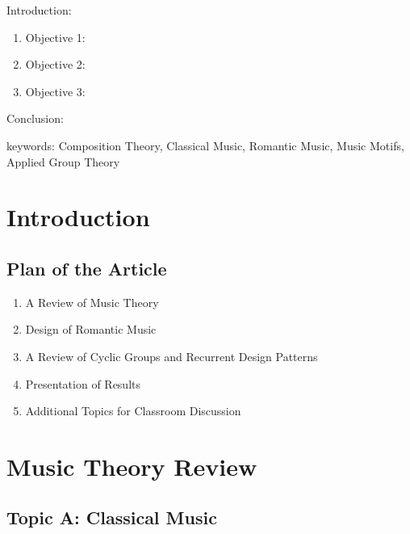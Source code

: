 
\twocolumn
\scriptsize
\begin{frontmatter}
		\title{}
		\author{}
		\address{The Mathematical Learning Space}
\end{frontmatter}	

Introduction:
\begin{enumerate}
\item Objective 1:
\item Objective 2:
\item Objective 3:
\end{enumerate}
Conclusion:

keywords: Composition Theory, Classical Music, Romantic Music, Music Motifs, Applied Group Theory

\section{Introduction}

\subsection{Plan of the Article}

\begin{enumerate}
\item A Review of Music Theory 
\item Design of Romantic Music
\item A Review of Cyclic Groups and Recurrent Design Patterns 
\item Presentation of Results
\item Additional Topics for Classroom Discussion
\end{enumerate}

\section{Music Theory Review}

\subsection{Topic A: Classical Music}

